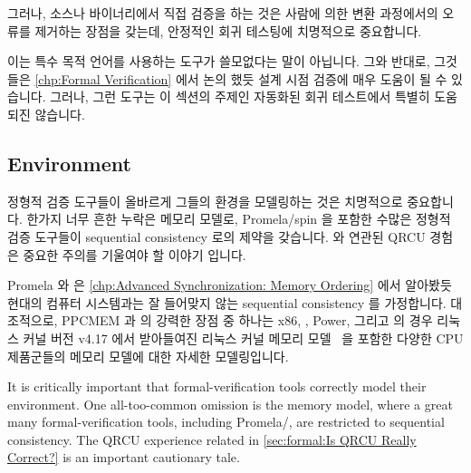 그러나, 소스나 바이너리에서 직접 검증을 하는 것은 사람에 의한 변환 과정에서의
오류를 제거하는 장점을 갖는데, 안정적인 회귀 테스팅에 치명적으로 중요합니다.

이는 특수 목적 언어를 사용하는 도구가 쓸모없다는 말이 아닙니다.
그와 반대로, 그것들은
\cref{chp:Formal Verification} 에서 논의 했듯 설계 시점 검증에 매우 도움이 될
수 있습니다.
그러나, 그런 도구는 이 섹션의 주제인 자동화된 회귀 테스트에서 특별히 도움되진
않습니다.

\iffalse

However, verifying directly from either the source or binary both have the
advantage of eliminating human translation errors, which is critically
important for reliable regression testing.

This is not to say that tools with special-purpose languages are useless.
On the contrary, they can be quite helpful for design-time verification,
as was discussed in
\cref{chp:Formal Verification}.
However, such tools are not particularly helpful for automated regression
testing, which is in fact the topic of this section.

\fi

\subsection{Environment}
\label{sec:future:Environment}

정형적 검증 도구들이 올바르게 그들의 환경을 모델링하는 것은 치명적으로
중요합니다.
한가지 너무 흔한 누락은 메모리 모델로, Promela/spin 을 포함한 수많은 정형적
검증 도구들이 sequential consistency 로의 제약을 갖습니다.
 와 연관된 QRCU 경험은 중요한 주의를
기울여야 할 이야기 입니다.

Promela 와  은
\cref{chp:Advanced Synchronization: Memory Ordering} 에서 알아봤듯 현대의
컴퓨터 시스템과는 잘 들어맞지 않는 sequential consistency 를 가정합니다.
대조적으로, PPCMEM 과  의 강력한 장점 중 하나는 x86, \ARM, Power,
그리고  의 경우 리눅스 커널 버전 v4.17 에서 받아들여진 리눅스 커널
메모리 모델~\cite{Alglave:2018:FSC:3173162.3177156} 을 포함한 다양한 CPU
제품군들의 메모리 모델에 대한 자세한 모델링입니다.

\iffalse

It is critically important that formal-verification tools correctly
model their environment.
One all-too-common omission is the memory model, where a great
many formal-verification tools, including Promela/, are
restricted to sequential consistency.
The QRCU experience related in
\cref{sec:formal:Is QRCU Really Correct?}
is an important cautionary tale.

